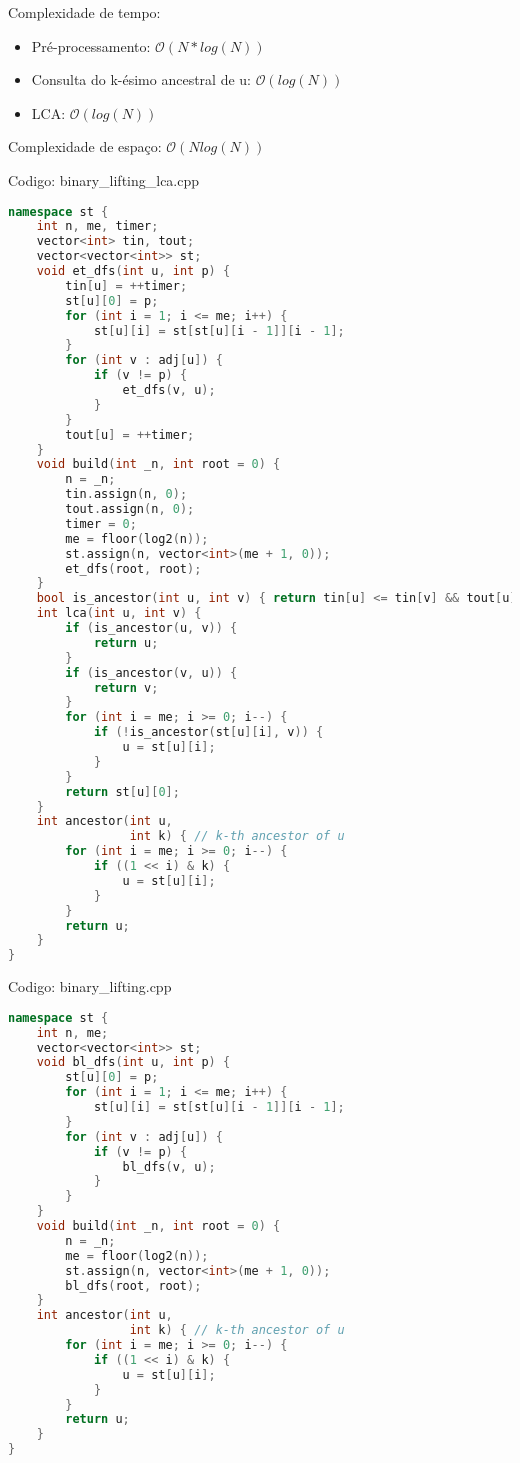 \documentclass[10pt, a4paper, oneside]{book}
\begin{document}
Complexidade de tempo:



\begin{itemize}
\item Pré-processamento: $\mathcal{O}(N * log(N))$
\item Consulta do k-ésimo ancestral de u: $\mathcal{O}(log(N))$
\item LCA: $\mathcal{O}(log(N))$
\end{itemize}



Complexidade de espaço: $\mathcal{O}(Nlog(N))$

\hfill

Codigo: binary\_lifting\_lca.cpp

\begin{lstlisting}[language=C++]
namespace st {
    int n, me, timer;
    vector<int> tin, tout;
    vector<vector<int>> st;
    void et_dfs(int u, int p) {
        tin[u] = ++timer;
        st[u][0] = p;
        for (int i = 1; i <= me; i++) {
            st[u][i] = st[st[u][i - 1]][i - 1];
        }
        for (int v : adj[u]) {
            if (v != p) {
                et_dfs(v, u);
            }
        }
        tout[u] = ++timer;
    }
    void build(int _n, int root = 0) {
        n = _n;
        tin.assign(n, 0);
        tout.assign(n, 0);
        timer = 0;
        me = floor(log2(n));
        st.assign(n, vector<int>(me + 1, 0));
        et_dfs(root, root);
    }
    bool is_ancestor(int u, int v) { return tin[u] <= tin[v] && tout[u] >= tout[v]; }
    int lca(int u, int v) {
        if (is_ancestor(u, v)) {
            return u;
        }
        if (is_ancestor(v, u)) {
            return v;
        }
        for (int i = me; i >= 0; i--) {
            if (!is_ancestor(st[u][i], v)) {
                u = st[u][i];
            }
        }
        return st[u][0];
    }
    int ancestor(int u,
                 int k) { // k-th ancestor of u
        for (int i = me; i >= 0; i--) {
            if ((1 << i) & k) {
                u = st[u][i];
            }
        }
        return u;
    }
}
\end{lstlisting}
\hfill

Codigo: binary\_lifting.cpp

\begin{lstlisting}[language=C++]
namespace st {
    int n, me;
    vector<vector<int>> st;
    void bl_dfs(int u, int p) {
        st[u][0] = p;
        for (int i = 1; i <= me; i++) {
            st[u][i] = st[st[u][i - 1]][i - 1];
        }
        for (int v : adj[u]) {
            if (v != p) {
                bl_dfs(v, u);
            }
        }
    }
    void build(int _n, int root = 0) {
        n = _n;
        me = floor(log2(n));
        st.assign(n, vector<int>(me + 1, 0));
        bl_dfs(root, root);
    }
    int ancestor(int u,
                 int k) { // k-th ancestor of u
        for (int i = me; i >= 0; i--) {
            if ((1 << i) & k) {
                u = st[u][i];
            }
        }
        return u;
    }
}
\end{lstlisting}
\hfill
\end{document}
